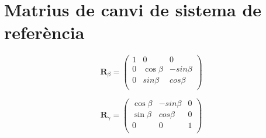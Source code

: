 \documentclass[11pt]{article}
\begin{document}
\section{Matrius de canvi de sistema de referència}\label{annex: matr_rot}
\begin{equation}
    \mathbf{R}_{\beta}=
    \begin{pmatrix}
      1 & 0 & 0   \\
      0 & \cos\beta& -sin\beta \\
      0 & sin\beta & cos\beta \\
    \end{pmatrix}
\end{equation}  

\begin{equation}
    \mathbf{R}_{\gamma}=
    \begin{pmatrix}
       \cos\beta& -sin\beta& 0 \\
       \sin\beta & cos\beta &0\\
      0 & 0 & 1  \\
    \end{pmatrix}
\end{equation}  
\end{document}
